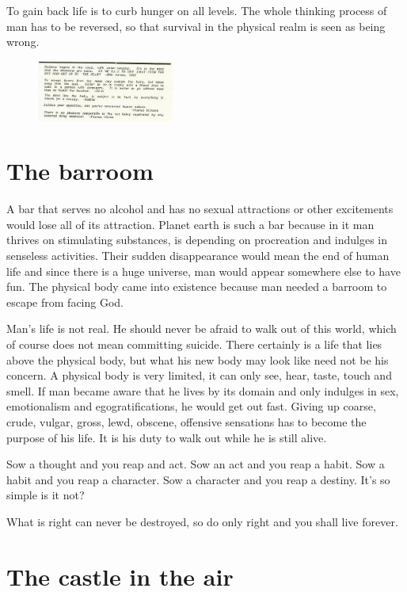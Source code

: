 \documentclass[landscape,twocolumn,letterpaper]{article}
\begin{document}
To gain back life is to curb hunger on all levels. The whole thinking
process of man has to be reversed, so that survival in the physical
realm is seen as being wrong.

\begin{figure} \centering
  \includegraphics[width=0.4\textwidth,bb= 0 0 443 198]{p31.jpg}
\end{figure}


\section{The barroom}
\label{sec:tb}

A bar that serves no alcohol and has no sexual attractions or other
excitements would lose all of its attraction. Planet earth is such a
bar because in it man thrives on stimulating substances, is depending
on procreation and indulges in senseless activities. Their sudden
disappearance would mean the end of human life and since there is a
huge universe, man would appear somewhere else to have fun. The
physical body came into existence because man needed a barroom to
escape from facing God.

Man's life is not real. He should never be afraid to walk out of this
world, which of course does not mean committing suicide. There
certainly is a life that lies above the physical body, but what his
new body may look like need not be his concern. A physical body is
very limited, it can only see, hear, taste, touch and smell. If man
became aware that he lives by its domain and only indulges in sex,
emotionalism and egogratifications, he would get out fast. Giving up
coarse, crude, vulgar, gross, lewd, obscene, offensive sensations has
to become the purpose of his life. It is his duty to walk out while he
is still alive.

Sow a thought and you reap and act. Sow an act and you reap a
habit. Sow a habit and you reap a character. Sow a character and you
reap a destiny. It's so simple is it not?

What is right can never be destroyed, so do only right and you shall
live forever.


\section{The castle in the air}
\label{sec:tcita}
\end{document}
